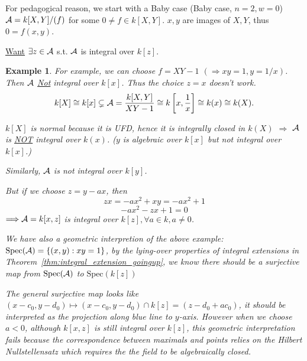 \documentclass[11pt]{article}
\newtheorem{ex}[thm]{Example}
\newcommand{\cala}{{\cal A}}
\newcommand{\Lrta}{\Longrightarrow}
\begin{document}
For pedagogical reason, we start with a Baby case
(Baby case, $n=2,w=0$) $\cala=k[X,Y]/(f)$ for some $0\neq f\in k[X,Y]$. $x,y$ are images of $X,Y$, thus $0=f(x,y)$. 

\underline{Want} $\exists z\in \cala$ s.t. $\cala$ is integral over $k[z]$.

\begin{ex}
For example, we can choose $f=XY-1$ $(\Lrta xy=1,y=1/x)$. Then $\cala$ \underline{Not} integral over $k[x]$. Thus the choice $z=x$ doesn't work.
$$
k[X]\cong k[x]\subsetneq \cala=\frac{k[X,Y]}{XY-1}\cong k\left[x,\frac{1}{x}\right]\cong k(x)\cong k(X).
$$

$k[X]$ is normal because it is UFD, hence it is integrally closed in $k(X)$ $\Lrta$ $\cala$ is \underline{NOT} integral over $k(x)$. ($y$ is algebraic over $k[x]$ but not integral over $k[x]$.)

Similarly, $\cala$ is not integral over $k[y]$.

But if we choose $z=y-ax$, then
$$
zx=-ax^2+xy=-ax^2+1
$$
$$
-ax^2-zx+1=0
$$
$\Lrta \cala=k[x,z]$ is integral over $k[z], \forall a\in k, a\neq 0$.

We have also a geometric interpretion of the above example:
$\text{Spec}(\cala)=\{(x,y): xy=1\}$, by the lying-over properties of integral extensions in Theorem~\ref{thm:integral_extension_goingup}, we know there should be a surjective map from $\text{Spec}(\cala)$ to $\text{Spec}(k[z])$
{\centering
{}
}


{\color{red} The general surjective map looks like $(x-c_0,y-d_0)\longmapsto (x-c_0,y-d_0)\cap k[z]=(z-d_0+a c_0) $, it should be interpreted as the projection along blue line to $y$-axis. However when we choose $a<0$, although $k[x,z]$ is still integral over $k[z]$, this geometric interpretation fails because the correspondence between maximals and points relies on the Hilbert Nullstellensatz which requires the the field to be algebraically closed. }
\end{ex}
\end{document}
